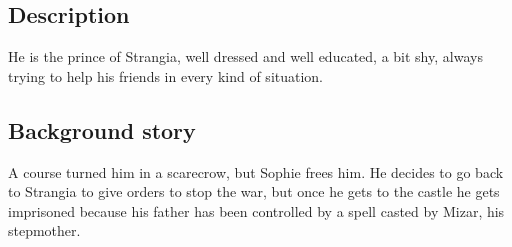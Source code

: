 \subsection{Description}
He is the prince of Strangia, well dressed and well educated, a bit shy, always trying to help his friends in every kind of situation.

\subsection{Background story}
A course turned him in a scarecrow, but Sophie frees him. He decides to go back to Strangia to give orders to stop the war, but once he gets to the castle he gets imprisoned because his father has been controlled by a spell casted by Mizar, his stepmother.
